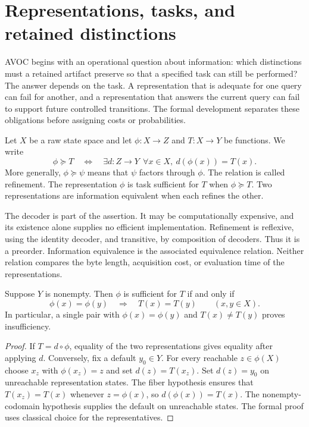 \section{Representations, tasks, and retained distinctions}
\label{sec:representations}

AVOC begins with an operational question about information: which distinctions must a retained artifact preserve so that a specified task can still be performed? The answer depends on the task. A representation that is adequate for one query can fail for another, and a representation that answers the current query can fail to support future controlled transitions. The formal development separates these obligations before assigning costs or probabilities.

\begin{definition}
Let $X$ be a raw state space and let $\phi:X\to Z$ and $T:X\to Y$ be functions. We write
\[
 \phi\succeq T
 \quad\Longleftrightarrow\quad
 \exists d:Z\to Y\ \ \forall x\in X,\ d(\phi(x))=T(x).
\]
More generally, $\phi\succeq\psi$ means that $\psi$ factors through $\phi$. The relation is called refinement. The representation $\phi$ is task sufficient for $T$ when $\phi\succeq T$. Two representations are information equivalent when each refines the other.
\end{definition}

The decoder is part of the assertion. It may be computationally expensive, and its existence alone supplies no efficient implementation. Refinement is reflexive, using the identity decoder, and transitive, by composition of decoders. Thus it is a preorder. Information equivalence is the associated equivalence relation. Neither relation compares the byte length, acquisition cost, or evaluation time of the representations.

\begin{theorem}
\label{thm:fiber-criterion}
Suppose $Y$ is nonempty. Then $\phi$ is sufficient for $T$ if and only if
\[
 \phi(x)=\phi(y)\quad\Longrightarrow\quad T(x)=T(y)
 \qquad(x,y\in X).
\]
In particular, a single pair with $\phi(x)=\phi(y)$ and $T(x)\ne T(y)$ proves insufficiency.
\end{theorem}
\begin{proof}
If $T=d\circ\phi$, equality of the two representations gives equality after applying $d$. Conversely, fix a default $y_0\in Y$. For every reachable $z\in\phi(X)$ choose $x_z$ with $\phi(x_z)=z$ and set $d(z)=T(x_z)$. Set $d(z)=y_0$ on unreachable representation states. The fiber hypothesis ensures that $T(x_z)=T(x)$ whenever $z=\phi(x)$, so $d(\phi(x))=T(x)$. The nonempty-codomain hypothesis supplies the default on unreachable states. The formal proof uses classical choice for the representatives.
\end{proof}

